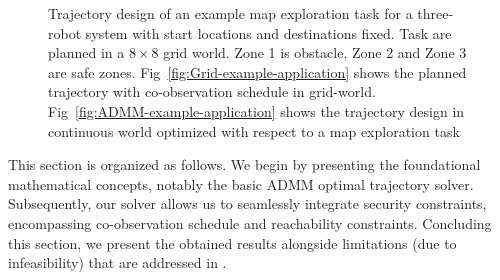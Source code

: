 \documentclass[journal]{IEEEtran}  %
\begin{document}
\begin{figure}
     \centering
     \caption{Trajectory design of an example map exploration task for a three-robot system with start locations and destinations fixed. Task are planned in a $8 \times 8$ grid world. Zone 1 is obstacle, Zone 2 and Zone 3 are safe zones. Fig~\ref{fig:Grid-example-application} shows the planned trajectory with co-observation schedule in grid-world. Fig~\ref{fig:ADMM-example-application} shows the trajectory design in continuous world optimized with respect to a map exploration task}
     \label{fig:example-application}
 \end{figure}
 
 This section is organized as follows. We begin by presenting the foundational mathematical concepts, notably the basic ADMM optimal trajectory solver. Subsequently, our solver allows us to seamlessly integrate security constraints, encompassing co-observation schedule and reachability constraints. Concluding this section, we present the obtained results alongside limitations (due to infeasibility) that are addressed in .
\end{document}
